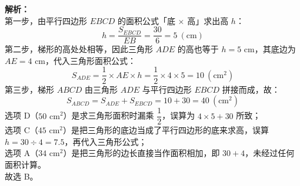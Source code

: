 \documentclass[12pt,a4paper]{exam-zh}
\begin{document}
\begin{solution}
    \textbf{解析：} \\
    第一步，由平行四边形 $EBCD$ 的面积公式「底 $\times$ 高」求出高 $h$：
    \[ \displaystyle h = \frac{S_{EBCD}}{EB} = \frac{30}{6} = 5\ (\text{cm}) \]
    第二步，梯形的高处处相等，因此三角形 $ADE$ 的高也等于 $h = 5\text{ cm}$，其底边为 $AE = 4\text{ cm}$，代入三角形面积公式：
    \[ \displaystyle S_{ADE} = \frac{1}{2} \times AE \times h = \frac{1}{2} \times 4 \times 5 = 10\ (\text{cm}^2) \]
    第三步，梯形 $ABCD$ 由三角形 $ADE$ 与平行四边形 $EBCD$ 拼接而成，故：
    \[ \displaystyle S_{ABCD} = S_{ADE} + S_{EBCD} = 10 + 30 = 40\ (\text{cm}^2) \]
    选项 D（$50\text{ cm}^2$）是求三角形面积时漏乘 $\dfrac{1}{2}$，误算为 $4\times5+30$ 所致；\\
    选项 C（$45\text{ cm}^2$）是把三角形的底边当成了平行四边形的底来求高，误算 $h = 30\div4 = 7.5$，再代入三角形公式；\\
    选项 A（$34\text{ cm}^2$）是把三角形的边长直接当作面积相加，即 $30 + 4$，未经过任何面积计算。\\
    故选 B。
\end{solution}
\end{document}
